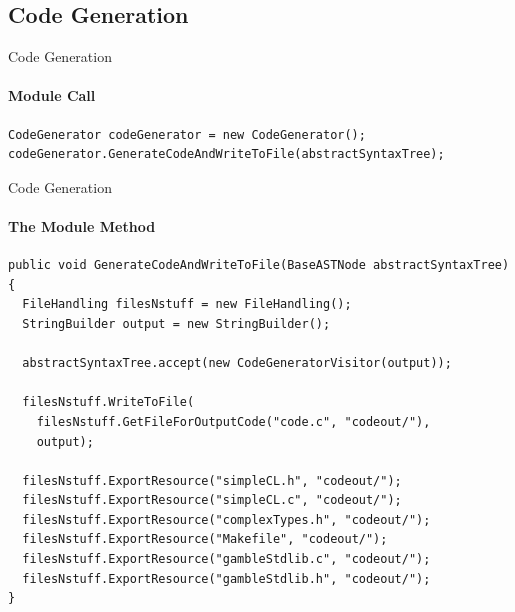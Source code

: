 \subsection{Code Generation}
\begin{frame}[fragile]{Code Generation}
\framesubtitle{Module Call}

\begin{lstlisting}[caption=The creation of an instance of the Code Generation module and the call invoking it ,frame=tlrb, basicstyle=\tiny, numbers=none]
CodeGenerator codeGenerator = new CodeGenerator();
codeGenerator.GenerateCodeAndWriteToFile(abstractSyntaxTree);
\end{lstlisting}

\end{frame}

\begin{frame}[fragile]{Code Generation}
\framesubtitle{The Module Method}

\begin{lstlisting}[caption=The method called from main performing Code Generation and exporting the files generated along with the needed libraries.,frame=tlrb, basicstyle=\tiny, numbers=none]
public void GenerateCodeAndWriteToFile(BaseASTNode abstractSyntaxTree){
  FileHandling filesNstuff = new FileHandling();
  StringBuilder output = new StringBuilder();

  abstractSyntaxTree.accept(new CodeGeneratorVisitor(output));

  filesNstuff.WriteToFile(
    filesNstuff.GetFileForOutputCode("code.c", "codeout/"),
    output);

  filesNstuff.ExportResource("simpleCL.h", "codeout/");
  filesNstuff.ExportResource("simpleCL.c", "codeout/");
  filesNstuff.ExportResource("complexTypes.h", "codeout/");
  filesNstuff.ExportResource("Makefile", "codeout/");
  filesNstuff.ExportResource("gambleStdlib.c", "codeout/");
  filesNstuff.ExportResource("gambleStdlib.h", "codeout/");
}

\end{lstlisting}

\end{frame}

